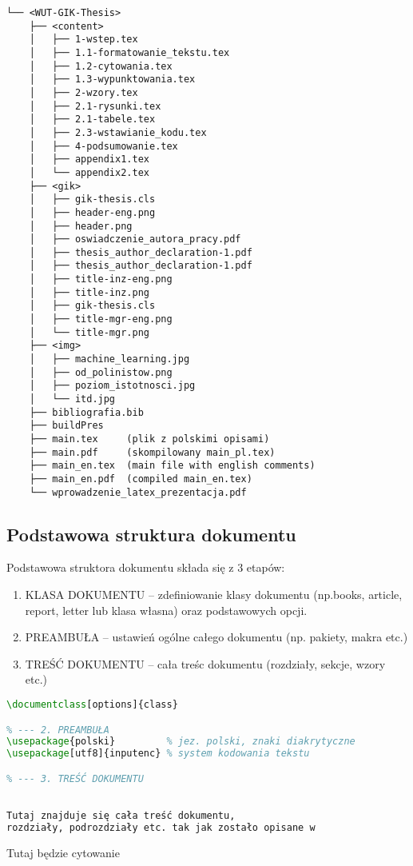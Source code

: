 \begin{verbatim}
└── <WUT-GIK-Thesis>
    ├── <content>
    │   ├── 1-wstep.tex
    │   ├── 1.1-formatowanie_tekstu.tex
    │   ├── 1.2-cytowania.tex
    │   ├── 1.3-wypunktowania.tex
    │   ├── 2-wzory.tex
    │   ├── 2.1-rysunki.tex
    │   ├── 2.1-tabele.tex
    │   ├── 2.3-wstawianie_kodu.tex
    │   ├── 4-podsumowanie.tex
    │   ├── appendix1.tex
    │   └── appendix2.tex
    ├── <gik>
    │   ├── gik-thesis.cls
    │   ├── header-eng.png
    │   ├── header.png
    │   ├── oswiadczenie_autora_pracy.pdf
    │   ├── thesis_author_declaration-1.pdf
    │   ├── thesis_author_declaration-1.pdf
    │   ├── title-inz-eng.png
    │   ├── title-inz.png
    │   ├── gik-thesis.cls
    │   ├── title-mgr-eng.png
    │   └── title-mgr.png
    ├── <img>
    │   ├── machine_learning.jpg
    │   ├── od_polinistow.png
    │   ├── poziom_istotnosci.jpg
    │   └── itd.jpg
    ├── bibliografia.bib 
    ├── buildPres
    ├── main.tex     (plik z polskimi opisami)
    ├── main.pdf     (skompilowany main_pl.tex)
    ├── main_en.tex  (main file with english comments)
	├── main_en.pdf  (compiled main_en.tex)
    └── wprowadzenie_latex_prezentacja.pdf 
\end{verbatim}

\newpage
\subsection{Podstawowa struktura dokumentu}
 Podstawowa struktora dokumentu składa się z 3 etapów:
 \begin{enumerate}
    \item KLASA DOKUMENTU -- zdefiniowanie klasy dokumentu (np.books, article, report, letter lub klasa własna) oraz podstawowych opcji.
    \item PREAMBUŁA -- ustawień ogólne całego dokumentu (np. pakiety, makra etc.)
    \item TREŚĆ DOKUMENTU -- cała treśc dokumentu (rozdziały, sekcje, wzory etc.)
 \end{enumerate}

\begin{lstlisting}[language=tex,caption={\emph{Podstawowa struktura dokumentu TeX} }]
% --- 1. KLASA DOKUMENTU
\documentclass[options]{class}

% --- 2. PREAMBUŁA
\usepackage{polski}         % jez. polski, znaki diakrytyczne
\usepackage[utf8]{inputenc} % system kodowania tekstu

% --- 3. TREŚĆ DOKUMENTU

	
Tutaj znajduje się cała treść dokumentu, 
rozdziały, podrozdziały etc. tak jak zostało opisane w 


\end{lstlisting}


Tutaj będzie cytowanie \citep{Wanninger1993}
